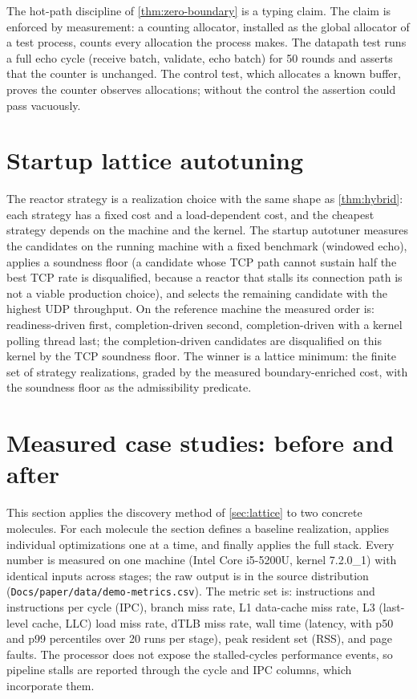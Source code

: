 The hot-path discipline of \autoref{thm:zero-boundary} is a typing
claim. The claim is enforced by measurement: a counting allocator,
installed as the global allocator of a test process, counts every
allocation the process makes. The datapath test runs a full echo
cycle (receive batch, validate, echo batch) for 50 rounds and asserts
that the counter is unchanged. The control test, which allocates a
known buffer, proves the counter observes allocations; without the
control the assertion could pass vacuously.

\section{Startup lattice autotuning}\label{sec:autotune}

The reactor strategy is a realization choice with the same shape as
\autoref{thm:hybrid}: each strategy has a fixed cost and a
load-dependent cost, and the cheapest strategy depends on the machine
and the kernel. The startup autotuner measures the candidates on the
running machine with a fixed benchmark (windowed echo), applies a
soundness floor (a candidate whose TCP path cannot sustain half the
best TCP rate is disqualified, because a reactor that stalls its
connection path is not a viable production choice), and selects the
remaining candidate with the highest UDP throughput. On the reference
machine the measured order is: readiness-driven first, completion-driven
second, completion-driven with a kernel polling thread last; the
completion-driven candidates are disqualified on this kernel by the TCP
soundness floor. The winner is a lattice minimum: the finite set of
strategy realizations, graded by the measured boundary-enriched cost,
with the soundness floor as the admissibility predicate.

\section{Measured case studies: before and after}\label{sec:demos}

This section applies the discovery method of \autoref{sec:lattice} to
two concrete molecules. For each molecule the section defines a
baseline realization, applies individual optimizations one at a time,
and finally applies the full stack. Every number is measured on one
machine (Intel Core i5-5200U, kernel 7.2.0\_1) with identical inputs
across stages; the raw output is in the source distribution
(\texttt{Docs/paper/data/demo-metrics.csv}). The metric set is:
instructions and instructions per cycle (IPC), branch miss rate, L1
data-cache miss rate, L3 (last-level cache, LLC) load miss rate, dTLB
miss rate, wall time (latency, with p50 and p99 percentiles over 20
runs per stage), peak resident set (RSS), and page faults. The
processor does not expose the stalled-cycles performance events, so
pipeline stalls are reported through the cycle and IPC columns, which
incorporate them.

